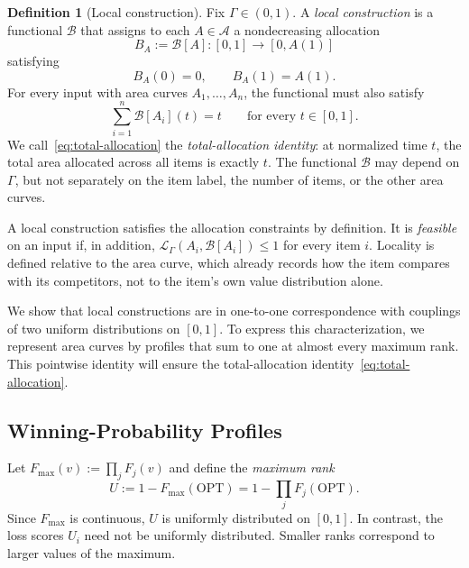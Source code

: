 \documentclass[11pt]{article}
\theoremstyle{definition}
\newtheorem{definition}[theorem]{Definition}
\theoremstyle{remark}
\newcommand{\OPT}{\mathrm{OPT}}
\begin{document}
\begin{definition}[Local construction]\label{def:local}
Fix $\Gamma\in(0,1)$.
A \emph{local construction} is a functional $\mathcal B$ that assigns to each $A\in\mathcal A$ a nondecreasing allocation
\[
 B_A:=\mathcal B[A]:[0,1]\to[0,A(1)]
\]
satisfying
\begin{equation}\label{eq:local-endpoints}
 B_A(0)=0,
 \qquad B_A(1)=A(1).
\end{equation}
For every input with area curves $A_1,\ldots,A_n$, the functional must also satisfy
\begin{equation}\label{eq:total-allocation}
 \sum_{i=1}^n\mathcal B[A_i](t)=t
 \qquad\text{for every }t\in[0,1].
\end{equation}
We call~\eqref{eq:total-allocation} the \emph{total-allocation identity}: at normalized time $t$, the total area allocated across all items is exactly $t$.
The functional $\mathcal B$ may depend on $\Gamma$, but not separately on the item label, the number of items, or the other area curves.
\end{definition}

A local construction satisfies the allocation constraints by definition.
It is \emph{feasible} on an input if, in addition, $\mathcal L_\Gamma(A_i,\mathcal B[A_i])\le1$ for every item $i$.
Locality is defined relative to the area curve, which already records how the item compares with its competitors, not to the item's own value distribution alone.

We show that local constructions are in one-to-one correspondence with couplings of two uniform distributions on $[0,1]$.
To express this characterization, we represent area curves by profiles that sum to one at almost every maximum rank. This pointwise identity will ensure the total-allocation identity~\eqref{eq:total-allocation}.

\subsection{Winning-Probability Profiles}\label{sec:profile}

Let $F_{\max}(v):=\prod_jF_j(v)$ and define the \emph{maximum rank}
\begin{equation}\label{eq:maximum-rank}
 U:=1-F_{\max}(\OPT)
   =1-\prod_jF_j(\OPT).
\end{equation}
Since $F_{\max}$ is continuous, $U$ is uniformly distributed on $[0,1]$.
In contrast, the loss scores $U_i$ need not be uniformly distributed.
Smaller ranks correspond to larger values of the maximum.
\end{document}

